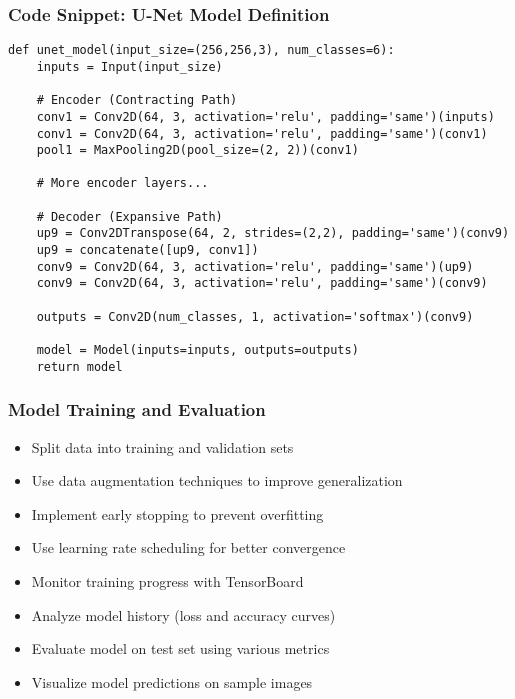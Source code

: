 \begin{frame}[fragile]\frametitle{Code Snippet: U-Net Model Definition}
\begin{lstlisting}
def unet_model(input_size=(256,256,3), num_classes=6):
    inputs = Input(input_size)
    
    # Encoder (Contracting Path)
    conv1 = Conv2D(64, 3, activation='relu', padding='same')(inputs)
    conv1 = Conv2D(64, 3, activation='relu', padding='same')(conv1)
    pool1 = MaxPooling2D(pool_size=(2, 2))(conv1)
    
    # More encoder layers...
    
    # Decoder (Expansive Path)
    up9 = Conv2DTranspose(64, 2, strides=(2,2), padding='same')(conv9)
    up9 = concatenate([up9, conv1])
    conv9 = Conv2D(64, 3, activation='relu', padding='same')(up9)
    conv9 = Conv2D(64, 3, activation='relu', padding='same')(conv9)
    
    outputs = Conv2D(num_classes, 1, activation='softmax')(conv9)
    
    model = Model(inputs=inputs, outputs=outputs)
    return model
\end{lstlisting}
\end{frame}

\begin{frame}[fragile]\frametitle{Model Training and Evaluation}
\begin{itemize}
\item Split data into training and validation sets
\item Use data augmentation techniques to improve generalization
\item Implement early stopping to prevent overfitting
\item Use learning rate scheduling for better convergence
\item Monitor training progress with TensorBoard
\item Analyze model history (loss and accuracy curves)
\item Evaluate model on test set using various metrics
\item Visualize model predictions on sample images
\end{itemize}
\end{frame}

